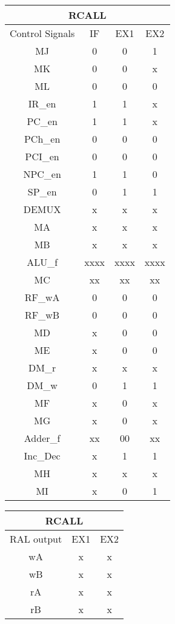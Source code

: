 \documentclass[12pt,letterpaper]{article}
\begin{document}
\begin{enumerate}
		\begin{tabular}{ |c|c|c|c| } 
			\hline
			\multicolumn{4}{|c|}{RCALL}\\ \hline
			Control Signals & IF & EX1 & EX2 \\ \hline
			MJ & 0  & 0 & 1 \\ \hline
			MK & 0 &  0  & x \\ \hline
			ML & 0 & 0 & 0 \\ \hline
			IR\_en& 1 & 1 &  x \\ \hline
			PC\_en & 1 &  1 & x \\ \hline
			PCh\_en & 0 & 0 &  0 \\ \hline
			PCI\_en  & 0 & 0 &  0 \\ \hline											
			NPC\_en  & 1 & 1 & 0 \\ \hline
			SP\_en  & 0 & 1 & 1 \\ \hline
			DEMUX  & x & x & x \\ \hline
			MA  & x & x &  x \\ \hline
			MB  & x & x  & x \\ \hline
			ALU\_f  & xxxx & xxxx & xxxx\\ \hline
			MC  & xx & xx & xx\\ \hline
			RF\_wA  & 0 & 0 & 0 \\ \hline
			RF\_wB  & 0 & 0 & 0 \\ \hline
			MD  & x &  0 & 0 \\ \hline
			ME  & x &  0 & 0 \\ \hline
			DM\_r  & x & x & x \\ \hline
			DM\_w  & 0 & 1 & 1 \\ \hline
			MF  & x & 0 & x \\ \hline
			MG  & x &  0 & x \\ \hline
			Adder\_f  & xx & 00 & xx \\ \hline
			Inc\_Dec  & x & 1 & 1 \\ \hline
			MH  & x & x &  x \\ \hline
			MI  & x & 0 & 1 \\ \hline
		\end{tabular}
		\quad
		\quad
		\begin{tabular}{ |c|c|c|} 
			\hline
			\multicolumn{3}{|c|}{RCALL}\\ \hline
			RAL output & EX1 & EX2 \\ \hline
			wA & x &  x \\ \hline
			wB & x &  x\\ \hline
			rA & x & x \\ \hline
			rB & x & x \\ \hline
		\end{tabular}









\end{enumerate}
\end{document}
